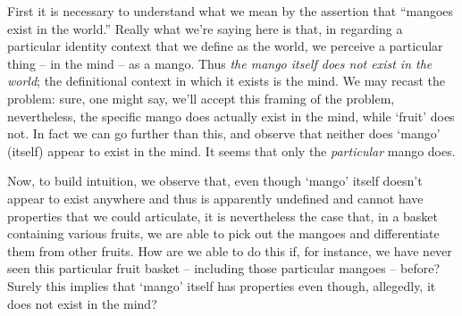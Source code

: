 \documentclass[pra,twocolumn,groupedaddress,10pt]{revtex4}
\theoremstyle{definition}
\begin{document}
First it is necessary to understand what we mean by the assertion that ``mangoes exist in the world.'' Really what we're saying here is that, in regarding a particular identity context that we define as the world, we perceive a particular thing -- in the mind -- as a mango. Thus \emph{the mango itself does not exist in the world}; the definitional context in which it exists is the mind. We may recast the problem: sure, one might say, we'll accept this framing of the problem, nevertheless, the specific mango does actually exist in the mind, while `fruit' does not. In fact we can go further than this, and observe that neither does `mango' (itself) appear to exist in the mind. It seems that only the \emph{particular} mango does.

Now, to build intuition, we observe that, even though `mango' itself doesn't appear to exist anywhere and thus is apparently undefined and cannot have properties that we could articulate, it is nevertheless the case that, in a basket containing various fruits, we are able to pick out the mangoes and differentiate them from other fruits. How are we able to do this if, for instance, we have never seen this particular fruit basket -- including those particular mangoes -- before? Surely this implies that `mango' itself has properties even though, allegedly, it does not exist in the mind?
\end{document}
